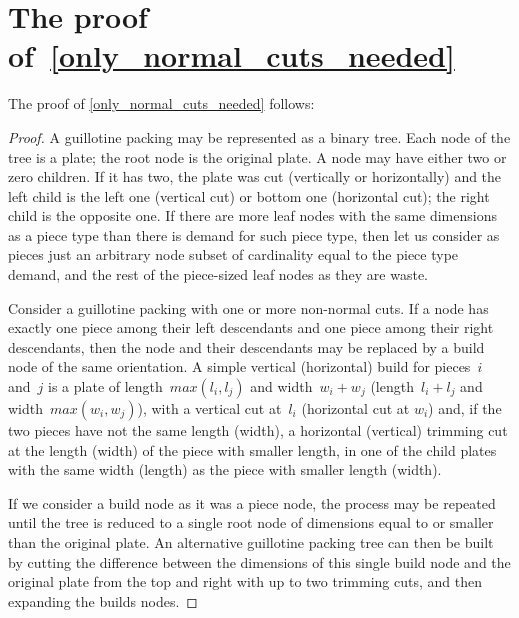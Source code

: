 \documentclass[runningheads]{llncs}
\begin{document}
%



\pagebreak
\appendix

\section{The proof of~\autoref{only_normal_cuts_needed}}

The proof of \autoref{only_normal_cuts_needed} follows:
\begin{proof}
A guillotine packing may be represented as a binary tree.
Each node of the tree is a plate; the root node is the original plate.
A node may have either two or zero children. If it has two, the plate was cut (vertically or horizontally) and the left child is the left one (vertical cut) or bottom one (horizontal cut); the right child is the opposite one.
If there are more leaf nodes with the same dimensions as a piece type than there is demand for such piece type, then let us consider as pieces just an arbitrary node subset of cardinality equal to the piece type demand, and the rest of the piece-sized leaf nodes as they are waste.

Consider a guillotine packing with one or more non-normal cuts.
If a node has exactly one piece among their left descendants and one piece among their right descendants, then the node and their descendants may be replaced by a build node of the same orientation.
A simple vertical (horizontal) build for pieces~\(i\) and~\(j\) is a plate of length~\(max(l_i, l_j)\) and width~\(w_i + w_j\) (length~\(l_i + l_j\) and width~\(max(w_i, w_j)\)), with a vertical cut at~\(l_i\) (horizontal cut at \(w_i\)) and, if the two pieces have not the same length (width), a horizontal (vertical) trimming cut at the length (width) of the piece with smaller length, in one of the child plates with the same width (length) as the piece with smaller length (width).

If we consider a build node as it was a piece node, the process may be repeated until the tree is reduced to a single root node of dimensions equal to or smaller than the original plate.
An alternative guillotine packing tree can then be built by cutting the difference between the dimensions of this single build node and the original plate from the top and right with up to two trimming cuts, and then expanding the builds nodes.


\end{proof}
\end{document}
